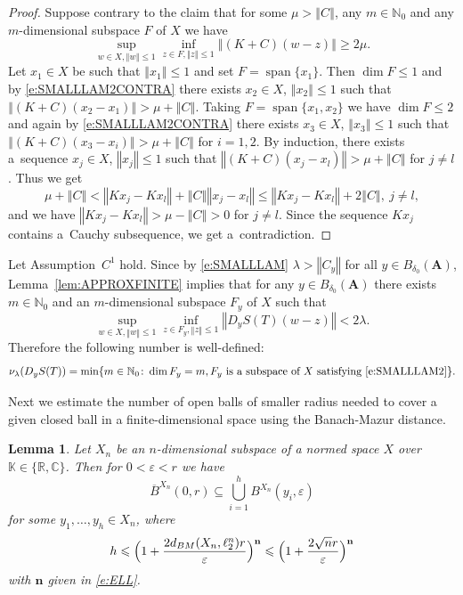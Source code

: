 \documentclass[a4paper,12pt,reqno]{amsart}
\theoremstyle{plain}
\newtheorem{lem}{Lemma}[section]
\theoremstyle{definition}
\numberwithin{equation}{section}
\newcommand{\N}{\mathbb{N}}
\newcommand{\R}{\mathbb{R}}
\newcommand{\C}{\mathbb{C}}
\newcommand{\K}{\mathbb{K}}
\newcommand{\norm}[1]{\left\Vert#1\right\Vert}
\newcommand{\eps}{\varepsilon}
\newcommand{\lin}{\operatorname{span}}
\renewcommand{\geq}{\geqslant}
\renewcommand{\leq}{\leqslant}
\begin{document}
\begin{proof}
Suppose contrary to the claim that for some $\mu>\norm{C}$, any $m\in\N_0$ and any $m$-dimensional subspace $F$ of $X$ we have
\begin{equation}\label{e:SMALLLAM2CONTRA}
\sup_{w\in X, \norm{w}\leq 1}\inf_{z\in F, \norm{z}\leq 1}\norm{(K+C)(w-z)}\geq 2\mu. 
\end{equation}
Let $x_1\in X$ be such that $\norm{x_1}\leq 1$ and set $F=\lin\{x_1\}$. Then $\dim{F}\leq 1$ and by \eqref{e:SMALLLAM2CONTRA} there exists $x_2\in X$, $\norm{x_2}\leq 1$ such that $\norm{(K+C)(x_2-x_1)}>\mu+\norm{C}$. Taking $F=\lin\{x_1,x_2\}$ we have $\dim{F}\leq 2$ and again by \eqref{e:SMALLLAM2CONTRA} there exists $x_3\in X$, $\norm{x_3}\leq 1$ such that $\norm{(K+C)(x_3-x_i)}>\mu+\norm{C}$ for $i=1,2$. By induction, there exists a~sequence $x_j\in X$, $\norm{x_j}\leq 1$ such that $\norm{(K+C)(x_j-x_l)}>\mu+\norm{C}$ for $j\neq l$.
Thus we get
$$\mu+\norm{C}<\norm{K x_j-K x_l}+\norm{C}\norm{x_j-x_l}\leq \norm{K x_j-K x_l}+2\norm{C},\ j\neq l,$$
and we have $\norm{K x_j-K x_l}>\mu-\norm{C}>0$ for $j\neq l$.
Since the sequence $K x_j$ contains a~Cauchy subsequence, we get a~contradiction.
\end{proof}

Let Assumption~$C^1$ hold.
Since by \eqref{e:SMALLLAM} $\lambda>\norm{C_y}$ for all $y\in B_{\delta_0}(\mathbf{A})$, Lemma~\ref{lem:APPROXFINITE} implies that
for any $y\in B_{\delta_0}(\mathbf{A})$ there exists $m\in\N_0$ and an $m$-dimensional subspace $F_{y}$ of $X$ such that
\begin{equation}\label{e:SMALLLAM2}
\sup_{w\in X, \norm{w}\leq 1}\inf_{z\in F_y, \norm{z}\leq 1}\norm{D_y S(T)(w-z)}<2\lambda. 
\end{equation}
Therefore the following number is well-defined: 
\begin{equation*}
\nu_{\lambda}(D_y S(T))=\min\{m\in\N_0\colon\dim{F_y}=m, F_y\text{ is a subspace of }X\text{ satisfying }\eqref{e:SMALLLAM2}\}.  
\end{equation*}

Next we estimate the number of open balls of smaller radius needed to cover a given closed ball in a finite-dimensional space using the Banach-Mazur distance. 

\begin{lem}\label{lem:FINITE}
Let $X_n$ be an $n$-dimensional subspace of a normed space $X$ over $\K\in\{\R,\C\}$. Then for $0<\eps<r$ we have
\begin{equation}\label{e:MINIMALCOVERFINITE}
\overline{B}^{X_n}(0,r)\subseteq\bigcup_{i=1}^{h}B^{X_n}(y_i,\eps)
\end{equation}
for some $y_1,\ldots,y_h\in X_n$, where
\begin{equation}\label{e:MINIMALCOVERFINITEESTIMATE}
h\leq\Bigl(1+\frac{2d_{BM}(X_n,\ell^{n}_2)r}{\eps}\Bigr)^{\mathbf{n}}\leq\Bigl(1+\frac{2\sqrt{n}r}{\eps}\Bigr)^{\mathbf{n}}
\end{equation}
with $\mathbf{n}$ given in \eqref{e:ELL}.
\end{lem}
\end{document}
